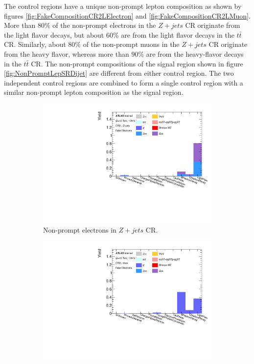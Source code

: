 The control regions have a unique non-prompt lepton composition as shown by figures \ref{fig:FakeCompositionCR2LElectron} and \ref{fig:FakeCompositionCR2LMuon}. More than $80\%$ of the non-prompt electrons in the $Z+jets$ CR originate from the light flavor decays, but about $60\%$ are from the light flavor decays in the $t\bar{t}$ CR. Similarly, about $80\%$ of the non-prompt muons in the $Z+jets$ CR originate from the heavy flavor, whereas more than $90\%$ are from the heavy-flavor decays in the $t\bar{t}$ CR. The non-prompt compositions of the signal region shown in figure \ref{fig:NonPromptLepSRDijet} are different from either control region. The two independent control regions are combined to form a single control region with a similar non-prompt lepton composition as the signal region.

\begin{figure}[ht]
    \begin{subfigure}{.48\textwidth}
      \centering
      \includegraphics[width=.9\linewidth]{figures/Analysis/Background/NonPromptZplusXElectrons.pdf}  
      \caption{Non-prompt electrons in $Z+jets$ CR.}
    \end{subfigure}
    \begin{subfigure}{.48\textwidth}
      \centering
      \includegraphics[width=.9\linewidth]{figures/Analysis/Background/NonPromptttbarElectron.pdf}

\end{subfigure}
\end{figure}

